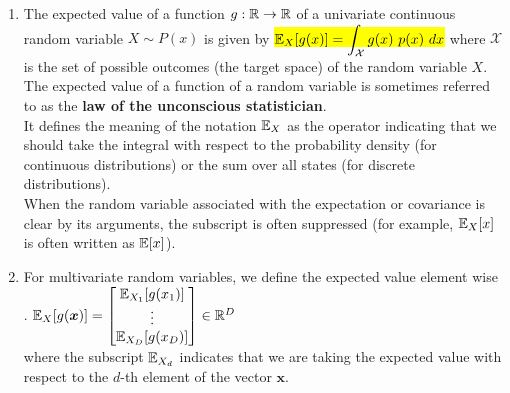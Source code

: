 \begin{enumerate}[series=calcrulesrv]
    \item The expected value of a function $g : \mathbb{R} \to \mathbb{R}$ of a univariate continuous random variable $X \sim P(x)$ is given by 
    \colorbox{yellow}{$\mbbE_X [g(x)] = \dint_ {\mathcal{X}} g(x)\ p(x)\ dx$}
    where $\mathcal{X}$ is the set of possible outcomes (the target space) of the random variable $X$.
    \hfill \cite{mfml/book/mml/Deisenroth-Faisal-Ong}
    \\[0.2cm]
    The expected value of a function of a random variable is sometimes referred to as the \textbf{law of the unconscious statistician}. 
    \hfill \cite{mfml/book/mml/Deisenroth-Faisal-Ong}
    \\
    It defines the meaning of the notation $\mathbb{E}_X$ as the operator indicating that we should take the integral with respect to the probability density (for continuous distributions) or the sum over all states (for discrete distributions).
    \hfill \cite{mfml/book/mml/Deisenroth-Faisal-Ong}
    \\
    When the random variable associated with the expectation or covariance is clear by its arguments, the subscript is often suppressed (for example, $\mathbb{E}_X [x]$ is often written as $\mathbb{E}[x]$).
    \hfill \cite{mfml/book/mml/Deisenroth-Faisal-Ong}

    \item For multivariate random variables, we define the expected value element wise
    \hfill \cite{mfml/book/mml/Deisenroth-Faisal-Ong}
    \\[0.2cm]
    .\hfill
    $
        \mathbb{E}_X [g(\bm{x})] = \begin{bmatrix}
            \mathbb{E}_{X_1} [g(x_1)] \\ \vdots \\ \mathbb{E}_{X_D} [g(x_D )]
        \end{bmatrix}
        \in \mathbb{R}^D
    $
    \hfill \cite{mfml/book/mml/Deisenroth-Faisal-Ong}
    \\[0.2cm]
    where the subscript $\mathbb{E}_{X_d}$ indicates that we are taking the expected value with respect to the $d$-th element of the vector $\bm{x}$.
    \hfill \cite{mfml/book/mml/Deisenroth-Faisal-Ong}


\end{enumerate}
